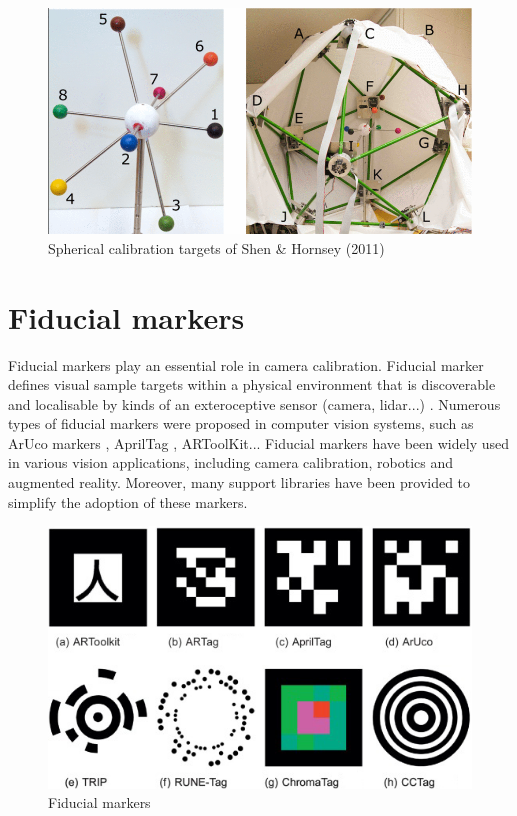 \begin{figure}[ht]
\centering
\includegraphics[width=1\textwidth]{Images/Shen (2011).png}
\caption{Spherical calibration targets of Shen \& Hornsey (2011)}
\end{figure}

\clearpage
\section{Fiducial markers}
Fiducial markers play an essential role in camera calibration. Fiducial marker defines visual sample targets within a physical environment that is discoverable and localisable by kinds of an exteroceptive sensor (camera, lidar...) \citep{Korthals2019}. Numerous types of fiducial markers were proposed in computer vision systems, such as ArUco markers \citep{Garrido-Jurado2014}, AprilTag \citep{Olson2011}, ARToolKit... Fiducial markers have been widely used in various vision applications, including camera calibration, robotics and augmented reality. Moreover, many support libraries have been provided to simplify the adoption of these markers.

\begin{figure}[ht]
\centering
\includegraphics[width=1\textwidth]{Images/Fiducial markers.jpg}
\caption{Fiducial markers}
\end{figure}

